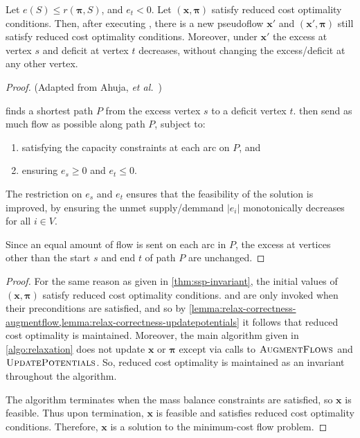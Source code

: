 \begin{lemma} \label{lemma:relax-correctness-augmentflow}
    Let $e(S) \leq r(\boldsymbol{\pi},S)$, and $e_t < 0$. Let $\left(\mathbf{x},\boldsymbol{\pi}\right)$ satisfy reduced cost optimality conditions. Then, after executing , there is a new pseudoflow $\mathbf{x}'$ and $\left(\mathbf{x}',\boldsymbol{\pi}\right)$ still satisfy reduced cost optimality conditions. Moreover, under $\mathbf{x}'$ the excess at vertex $s$ and deficit at vertex $t$ decreases, without changing the excess/deficit at any other vertex.
\end{lemma}
\begin{proof} (Adapted from Ahuja, \textit{et al.}~\cite[p.~336]{Ahuja:1993})
    
     finds a shortest path $P$ from the excess vertex $s$ to a deficit vertex $t$.  then send as much flow as possible along path $P$, subject to:
    \begin{enumerate}
        \item satisfying the capacity constraints at each arc on $P$, and
        \item ensuring $e_s \geq 0$ and $e_t \leq 0$.
    \end{enumerate}
    The restriction on $e_s$ and $e_t$ ensures that the feasibility of the solution is improved, by ensuring the unmet supply/demmand $|e_i|$ monotonically decreases for all $i \in V$\footnotemark.
    
    Since an equal amount of flow is sent on each arc in $P$, the excess at vertices other than the start $s$ and end $t$ of path $P$ are unchanged.
\end{proof}

\relaxcorrectness*
\begin{proof}
    For the same reason as given in \cref{thm:ssp-invariant}, the initial values of $\left(\mathbf{x},\boldsymbol{\pi}\right)$ satisfy reduced cost optimality conditions.  and  are only invoked when their preconditions are satisfied, and so by \cref{lemma:relax-correctness-augmentflow,lemma:relax-correctness-updatepotentials} it follows that reduced cost optimality is maintained. Moreover, the main algorithm given in \cref{algo:relaxation} does not update $\mathbf{x}$ or $\boldsymbol{\pi}$ except via calls to $\textproc{AugmentFlows}$ and $\textproc{UpdatePotentials}$. So, reduced cost optimality is maintained as an invariant throughout the algorithm.
    
    The algorithm terminates when the mass balance constraints are satisfied, so $\mathbf{x}$ is feasible. Thus upon termination, $\mathbf{x}$ is feasible and satisfies reduced cost optimality conditions. Therefore, $\mathbf{x}$ is a solution to the minimum-cost flow problem. 
\end{proof}

